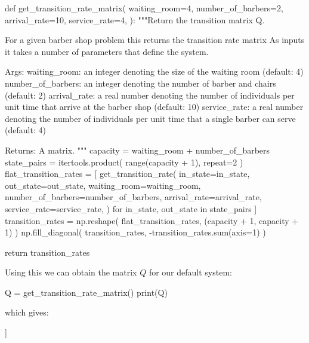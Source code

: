 \begin{pyin}
def get_transition_rate_matrix(
    waiting_room=4,
    number_of_barbers=2,
    arrival_rate=10,
    service_rate=4,
):
    """Return the transition matrix Q.

    For a given barber shop problem this returns
    the transition rate matrix As inputs it takes
    a number of parameters that define the system.


    Args:
        waiting_room: an integer denoting the size of the
                      waiting room (default: 4)
        number_of_barbers: an integer denoting the number of
                           barber and chairs (default: 2)
        arrival_rate: a real number denoting the number of
                      individuals per unit time that arrive at
                      the barber shop (default: 10)
        service_rate: a real number denoting the number of
                      individuals per unit time that a single
                      barber can serve (default: 4)

    Returns:
        A matrix.
    """
    capacity = waiting_room + number_of_barbers
    state_pairs = itertools.product(
        range(capacity + 1), repeat=2
    )
    flat_transition_rates = [
        get_transition_rate(
            in_state=in_state,
            out_state=out_state,
            waiting_room=waiting_room,
            number_of_barbers=number_of_barbers,
            arrival_rate=arrival_rate,
            service_rate=service_rate,
        )
        for in_state, out_state in state_pairs
    ]
    transition_rates = np.reshape(
        flat_transition_rates, (capacity + 1, capacity + 1)
    )
    np.fill_diagonal(
        transition_rates, -transition_rates.sum(axis=1)
    )

    return transition_rates
\end{pyin}

Using this we can obtain the matrix \(Q\) for our default system:

\begin{pyin}
Q = get_transition_rate_matrix()
print(Q)
\end{pyin}

which gives:

\begin{pyout}
[[-10  10   0   0   0   0   0]
 [  4 -14  10   0   0   0   0]
 [  0   8 -18  10   0   0   0]
 [  0   0   8 -18  10   0   0]
 [  0   0   0   8 -18  10   0]
 [  0   0   0   0   8 -18  10]
 [  0   0   0   0   0   8  -8]]
\end{pyout}

